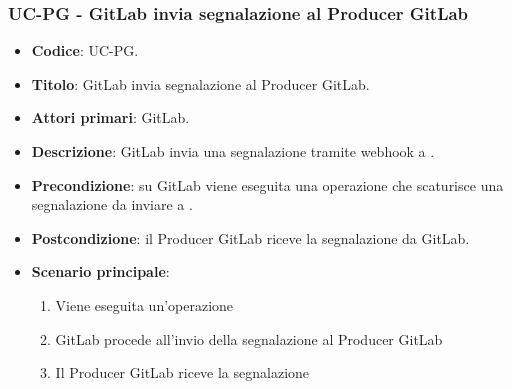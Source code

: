 \subsubsection{UC\theuccount-PG - GitLab invia segnalazione al Producer GitLab}
\begin{itemize}
    \item \textbf{Codice}: UC\theuccount-PG.
    \item \textbf{Titolo}: GitLab invia segnalazione al Producer GitLab.
    \item \textbf{Attori primari}: GitLab.
    \item \textbf{Descrizione}: GitLab invia una segnalazione tramite webhook a \progetto.
    \item \textbf{Precondizione}: su GitLab viene eseguita una operazione che scaturisce una
    segnalazione da inviare a \progetto.
    \item \textbf{Postcondizione}: il Producer GitLab riceve la segnalazione da GitLab.
    \item \textbf{Scenario principale}: 
    \begin{enumerate}
        \item Viene eseguita un'operazione
        \item GitLab procede all'invio della segnalazione al Producer GitLab
        \item Il Producer GitLab riceve la segnalazione
    \end{enumerate}
    
\end{itemize}


